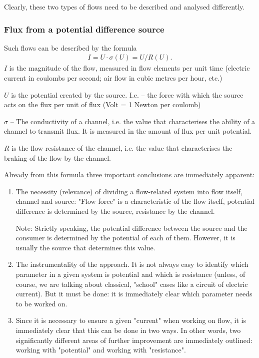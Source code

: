 \documentclass[a4paper,11pt]{article}
\begin{document}
Clearly, these two types of flows need to be described and analysed
differently.

\subsubsection{Flux from a potential difference source}

Such flows can be described by the formula
\begin{gather*}
  I = U\cdot\sigma(U) = U/R(U).
\end{gather*}
$I$ is the magnitude of the flow, measured in flow elements per unit time
(electric current in coulombs per second; air flow in cubic metres per hour,
etc.)

$U$ is the potential created by the source. I.e. -- the force with which the
source acts on the flux per unit of flux (Volt = 1 Newton per coulomb)

$\sigma$ -- The conductivity of a channel, i.e. the value that characterises
the ability of a channel to transmit flux. It is measured in the amount of
flux per unit potential.

$R$ is the flow resistance of the channel, i.e. the value that characterises
the braking of the flow by the channel.

Already from this formula three important conclusions are immediately
apparent:
\begin{enumerate}
\item The necessity (relevance) of dividing a flow-related system into flow
  itself, channel and source: "Flow force" is a characteristic of the flow
  itself, potential difference is determined by the source, resistance by the
  channel.

  Note: Strictly speaking, the potential difference between the source and the
  consumer is determined by the potential of each of them. However, it is
  usually the source that determines this value.
\item The instrumentality of the approach. It is not always easy to identify
  which parameter in a given system is potential and which is resistance
  (unless, of course, we are talking about classical, "school" cases like a
  circuit of electric current). But it must be done: it is immediately clear
  which parameter needs to be worked on.
\item Since it is necessary to ensure a given "current" when working on flow,
  it is immediately clear that this can be done in two ways. In other words,
  two significantly different areas of further improvement are immediately
  outlined: working with "potential" and working with "resistance".
\end{enumerate}
\end{document}
